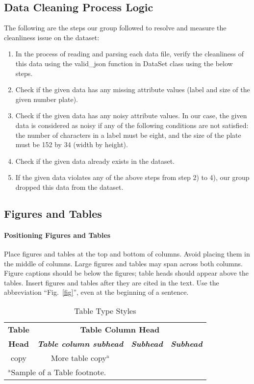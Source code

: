 \documentclass[conference]{IEEEtran}
\begin{document}
\subsection{Data Cleaning Process Logic}
The following are the steps our group followed to resolve and measure the cleanliness issue on the dataset:
\begin{enumerate}
\item In the process of reading and parsing each data file, verify the cleanliness of this data using the valid\_json function in DataSet class using the below steps.
\item Check if the given data has any missing attribute values (label and size of the given number plate).
\item Check if the given data has any noisy attribute values. In our case, the given data is considered as noisy if any of the following conditions are not satisfied: the number of characters in a label must be eight, and the size of the plate must be 152 by 34 (width by height).
\item Check if the given data already exists in the dataset.
\item If the given data violates any of the above steps from step 2) to 4), our group dropped this data from the dataset.
\end{enumerate}

\subsection{Figures and Tables}
\paragraph{Positioning Figures and Tables} Place figures and tables at the top and 
bottom of columns. Avoid placing them in the middle of columns. Large 
figures and tables may span across both columns. Figure captions should be 
below the figures; table heads should appear above the tables. Insert 
figures and tables after they are cited in the text. Use the abbreviation 
``Fig.~\ref{fig}'', even at the beginning of a sentence.

\begin{table}[htbp]
\caption{Table Type Styles}
\begin{center}
\begin{tabular}{|c|c|c|c|}
\hline
\textbf{Table}&\multicolumn{3}{|c|}{\textbf{Table Column Head}} \\
\cline{2-4} 
\textbf{Head} & \textbf{\textit{Table column subhead}}& \textbf{\textit{Subhead}}& \textbf{\textit{Subhead}} \\
\hline
copy& More table copy$^{\mathrm{a}}$& &  \\
\hline
\multicolumn{4}{l}{$^{\mathrm{a}}$Sample of a Table footnote.}
\end{tabular}
\label{tab1}
\end{center}
\end{table}
\end{document}
